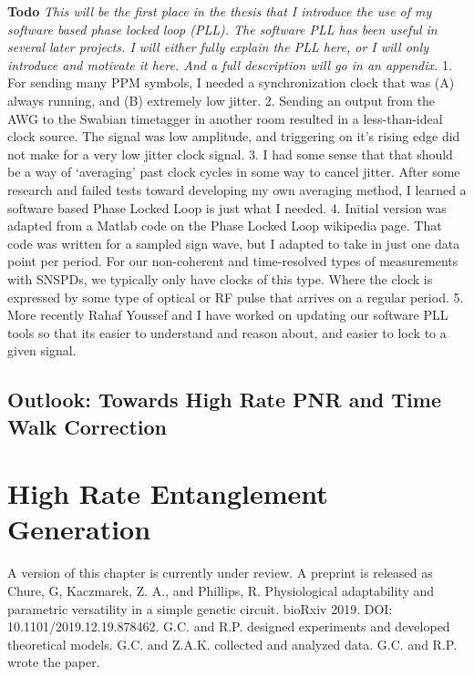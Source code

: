\documentclass[11pt]{caltech_thesis} %
\begin{document}
\textbf{Todo} \emph{This will be the first place in the thesis that I
introduce the use of my software based phase locked loop (PLL). The
software PLL has been useful in several later projects. I will either
fully explain the PLL here, or I will only introduce and motivate it
here. And a full description will go in an appendix. } 1. For sending
many PPM symbols, I needed a synchronization clock that was (A) always
running, and (B) extremely low jitter. 2. Sending an output from the AWG
to the Swabian timetagger in another room resulted in a less-than-ideal
clock source. The signal was low amplitude, and triggering on it's
rising edge did not make for a very low jitter clock signal. 3. I had
some sense that that should be a way of `averaging' past clock cycles in
some way to cancel jitter. After some research and failed tests toward
developing my own averaging method, I learned a software based Phase
Locked Loop is just what I needed. 4. Initial version was adapted from a
Matlab code on the Phase Locked Loop wikipedia page. That code was
written for a sampled sign wave, but I adapted to take in just one data
point per period. For our non-coherent and time-resolved types of
measurements with SNSPDs, we typically only have clocks of this type.
Where the clock is expressed by some type of optical or RF pulse that
arrives on a regular period. 5. More recently Rahaf Youssef and I have
worked on updating our software PLL tools so that its easier to
understand and reason about, and easier to lock to a given signal.

\hypertarget{outlook-towards-high-rate-pnr-and-time-walk-correction}{%
\section{Outlook: Towards High Rate PNR and Time Walk
Correction}\label{outlook-towards-high-rate-pnr-and-time-walk-correction}}

\hypertarget{high-rate-entanglement-generation}{%
\chapter{High Rate Entanglement
Generation}\label{high-rate-entanglement-generation}}

A version of this chapter is currently under review. A preprint is
released as Chure, G, Kaczmarek, Z. A., and Phillips, R. Physiological
adaptability and parametric versatility in a simple genetic circuit.
bioRxiv 2019. DOI: 10.1101/2019.12.19.878462. G.C. and R.P. designed
experiments and developed theoretical models. G.C. and Z.A.K. collected
and analyzed data. G.C. and R.P. wrote the paper.
\end{document}
